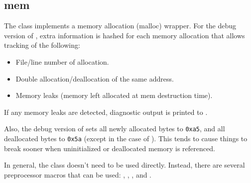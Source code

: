 %
%
%
%
%              

\subsection{mem}
\label{mem}

The  class implements a memory allocation (malloc) wrapper.  For
the debug version of , extra information is hashed for each
memory allocation that allows tracking of the following:

\begin{itemize}
\item{File/line number of allocation.}
\item{Double allocation/deallocation of the same address.}
\item{Memory leaks (memory left allocated at mem destruction time).}
\end{itemize}

If any memory leaks are detected, diagnostic output is printed to
.

Also, the debug version of  sets all newly allocated bytes to
{\tt 0xa5}, and all deallocated bytes to {\tt 0x5a} (except in the case of
).  This tends to cause things to break sooner when
uninitialized or deallocated memory is referenced.

In general, the  class doesn't need to be used directly.
Instead, there are several preprocessor macros that can be used:
, ,
, and .

